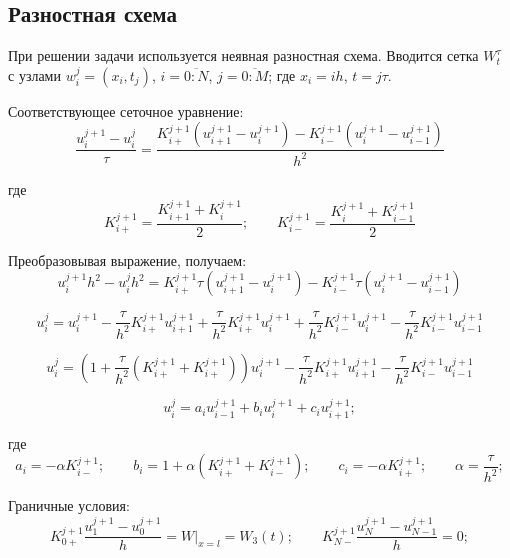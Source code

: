 \documentclass[a4paper,12pt]{article}
\begin{document}
\subsection{Разностная схема}

При решении задачи используется неявная разностная схема.
Вводится сетка $W_t^\tau$ с узлами \(w_i^j = (x_i, t_j)\), \(i = \overline{0:N}\), \(j = \overline{0:M}\); где \(x_i = ih\), \(t = j\tau\).

Соответствующее сеточное уравнение:
\begin{equation}
\frac{u_i^{j+1} - u_i^j}{\tau} = \frac{K_{i+}^{j+1}(u_{i+1}^{j+1} - u_i^{j+1}) - K_{i-}^{j+1}(u_i^{j+1} - u_{i-1}^{j+1})}{h^2}
\end{equation}

где
\begin{equation}
K_{i+}^{j+1} = \frac{K_{i+1}^{j+1} + K_i^{j+1}}{2};   \qquad
K_{i-}^{j+1} = \frac{K_i^{j+1} + K_{i-1}^{j+1}}{2} 
\end{equation}

Преобразовывая выражение, получаем:
\begin{equation}
u_i^{j+1}h^2 - u_i^jh^2 = K_{i+}^{j+1} \tau (u_{i+1}^{j+1} - u_i^{j+1}) - K_{i-}^{j+1} \tau (u_i^{j+1} - u_{i-1}^{j+1})
\end{equation}

\begin{equation}
u_i^j = u_i^{j+1} - \frac{\tau}{h^2}K_{i+}^{j+1}u_{i+1}^{j+1} + \frac{\tau}{h^2}K_{i+}^{j+1}u_i^{j+1} + \frac{\tau}{h^2}K_{i-}^{j+1}u_i^{j+1} - \frac{\tau}{h^2}K_{i-}^{j+1}u_{i-1}^{j+1}
\end{equation}

\begin{equation}
u_i^j = ( 1 + \frac{\tau}{h^2}(K_{i+}^{j+1}+K_{i+}^{j+1}))u_{i}^{j+1} - \frac{\tau}{h^2}K_{i+}^{j+1}u_{i+1}^{j+1} - \frac{\tau}{h^2}K_{i-}^{j+1}u_{i-1}^{j+1}
\end{equation}

\begin{equation}
u_i^j = a_iu_{i-1}^{j+1} + b_iu_i^{j+1} +c_iu_{i+1}^{j+1}; 
\end{equation}

где
\begin{displaymath}
a_i = -\alpha{K_{i-}^{j+1}};   \qquad
b_i = 1 + \alpha{(K_{i+}^{j+1} + K_{i-}^{j+1})};   \qquad
c_i = - \alpha{K_{i+}^{j+1}};   \qquad
\alpha = \frac{\tau}{h^2};
\end{displaymath}

Граничные условия:
\begin{equation}
K_{0+}^{j+1}\frac{u_1^{j+1} - u_0^{j+1}}{h} = W|_{x=l} = W_3(t);  \qquad
K_{N-}^{j+1}\frac{u_N^{j+1} - u_{N-1}^{j+1}}{h} = 0;
\end{equation}
\end{document}
